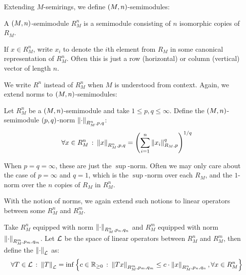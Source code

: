 Extending \(M\)-semirings,
we define \(\left(M, n\right)\)-semimodules:

\begin{definition}
  A \(\left(M, n\right)\)-semimodule \(R_M ^n\)
  is a semimodule consisting of \(n\) isomorphic copies of \(R_M\).
\end{definition}

If \(x \in R_M ^n\), write \(x_i\) to denote the \(i\)th element from
\(R_M\) in some canonical representation of \(R_M ^n\).
Often this is just a row (horizontal) or column (vertical)
vector of length \(n\).

We write \(R^n\) instead of \(R_M ^n\) when \(M\) is understood from context.
Again, we extend norms to \(\left(M, n\right)\)-semimodules:

\begin{definition}
  Let \(R_M ^n\) be a \(\left(M, n\right)\)-semimodule
  and take \(1 \leq p, q \leq \infty\).
  Define the \(\left(M, n\right)\)-semimodule \(\left(p, q\right)\)-norm
  \(\left\lVert\cdot\right\rVert_{R_M ^n, p, q}\):
  \begin{align*}
    \forall x \in R_M ^n \ \colon
      \left\lVert x\right\rVert_{R_M ^n, p, q}
        = \left(\sum_{i = 1}^{n} \left\lVert x_i\right\rVert_{R_M, p}^q\right)^{1 / q}
  \end{align*}
\end{definition}

When \(p = q = \infty\), these are just the \(\sup\)-norm.
Often we may only care about the case of \(p = \infty\) and \(q = 1\),
which is the \(\sup\)-norm over each \(R_M\),
and the \(1\)-norm over the \(n\) copies of \(R_M\) in \(R_M ^n\).

With the notion of norms, we again extend such notions to
linear operators between some \(R_M ^n\) and \(R_M ^m\).

\begin{definition}
  Take \(R_M ^n\) equipped with norm \(\left\lVert\cdot\right\rVert_{R_M ^n, p_n, q_n}\)
  and \(R_M ^m\) equipped with norm \(\left\lVert\cdot\right\rVert_{R_M ^m, p_m, q_m}\).
  Let \(\mathcal{L}\) be the space of linear operators between
  \(R_M ^n\) and \(R_M ^m\),
  then define the \(\left\lVert\cdot\right\rVert_{\mathcal{L}}\) as:
  \begin{align*}
    \forall T \in \mathcal{L} \ \colon
      \left\lVert T\right\rVert_{\mathcal{L}} =
        \inf \left\{c \in \mathbb{R}_{\geq 0} \ \colon
                \left\lVert Tx\right\rVert_{R_M ^m, p_m, q_m}
                  \leq c \cdot \left\lVert x\right\rVert_{R_M ^n, p_n, q_n},
                \forall x \in R_M ^n\right\}
  \end{align*}
\end{definition}


